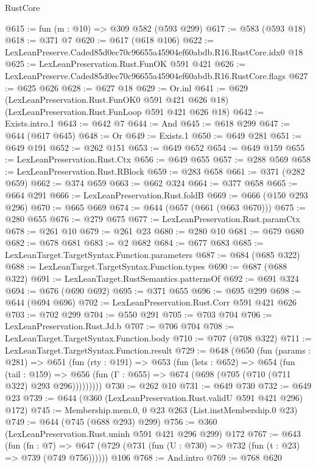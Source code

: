 \begin{lexlean}{RustCore}
\begin{coremodule}
@615 := fun (m : @10) => @309 @582 (@593 @299)
@617 := @583 (@593 @18)
@618 := @371 @7
@620 := @617 (@618 @106)
@622 := LexLeanPreserve.Caded85d0ec70c96655a45904ef60abdb.R16.RustCore.idx0 @18
@625 := LexLeanPreservation.Rust.FunOK @591 @421
@626 := LexLeanPreserve.Caded85d0ec70c96655a45904ef60abdb.R16.RustCore.flags
@627 := @625 @626
@628 := @627 @18
@629 := Or.inl
@641 := @629
    (LexLeanPreservation.Rust.FunOK0 @591 @421 @626 @18)
    (LexLeanPreservation.Rust.FunLoop @591 @421 @626 @18)
@642 := Exists.intro.{1}
@643 := @642 @7
@644 := And
@645 := @618 @299
@647 := @644 (@617 @645)
@648 := Or
@649 := Exists.{1}
@650 := @649 @281
@651 := @649 @191
@652 := @262 @151
@653 := @649 @652
@654 := @649 @159
@655 := LexLeanPreservation.Rust.Ctx
@656 := @649 @655
@657 := @288 @569
@658 := LexLeanPreservation.Rust.RBlock
@659 := @283 @658
@661 := @371 (@282 @659)
@662 := @374 @659
@663 := @662 @324
@664 := @377 @658
@665 := @664 @291
@666 := LexLeanPreservation.Rust.foldB
@669 := @666 (@150 @293 @296)
@670 := @665 @669
@674 := @644 (@657 (@661 (@663 @670)))
@675 := @280 @655
@676 := @279 @675
@677 := LexLeanPreservation.Rust.paramCtx
@678 := @261 @10
@679 := @261 @23
@680 := @280 @10
@681 := @679 @680
@682 := @678 @681
@683 := @2 @682
@684 := @677 @683
@685 := LexLeanTarget.TargetSyntax.Function.parameters
@687 := @684 (@685 @322)
@688 := LexLeanTarget.TargetSyntax.Function.types
@690 := @687 (@688 @322)
@691 := LexLeanTarget.RustSemantics.patternsOf
@692 := @691 @324
@694 := @676 (@690 @692)
@695 := @371 @655
@696 := @695 @299
@698 := @644 (@694 @696)
@702 := LexLeanPreservation.Rust.Corr @591 @421 @626
@703 := @702 @299
@704 := @550 @291
@705 := @703 @704
@706 := LexLeanPreservation.Rust.Jd.b
@707 := @706 @704
@708 := LexLeanTarget.TargetSyntax.Function.body
@710 := @707 (@708 @322)
@711 := LexLeanTarget.TargetSyntax.Function.result
@729 := @648
    (@650
      (fun (params : @281) =>
      @651
        (fun (rty : @191) =>
        @653
          (fun (lets : @652) =>
          @654
            (fun (tail : @159) =>
            @656 (fun (Γ : @655) => @674 (@698 (@705 (@710 (@711 @322) @293 @296)))))))))
@730 := @262 @10
@731 := @649 @730
@732 := @649 @23
@739 := @644 (@360 (LexLeanPreservation.Rust.validU @591 @421 @296) @172)
@745 := Membership.mem.{0, 0} @23 @263 (List.instMembership.{0} @23)
@749 := @644 (@745 (@688 @293) @299)
@756 := @360 (LexLeanPreservation.Rust.uninh @591 @421 @296 @299) @172
@767 := @643
    (fun (fn : @7) =>
    @647 (@729 (@731 (fun (U : @730) => @732 (fun (t : @23) => @739 (@749 @756))))))
    @106
@768 := And.intro
@769 := @768 @620

\end{coremodule}
\end{lexlean}
